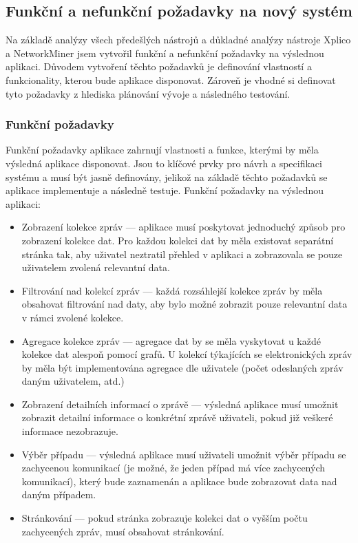 \subsection{Funkční a nefunkční požadavky na nový systém}
Na základě analýzy všech předešlých nástrojů a důkladné analýzy nástroje Xplico a NetworkMiner jsem vytvořil funkční a nefunkční požadavky na výslednou aplikaci. Důvodem vytvoření těchto požadavků je definování vlastností a funkcionality, kterou bude aplikace disponovat. Zároveň je vhodné si definovat tyto požadavky z hlediska plánování vývoje a následného testování.

\subsubsection*{Funkční požadavky}
Funkční požadavky aplikace zahrnují vlastnosti a funkce, kterými by měla výsledná aplikace disponovat. Jsou to klíčové prvky pro návrh a specifikaci systému a musí být jasně definovány, jelikož na základě těchto požadavků se aplikace implementuje a následně testuje. Funkční požadavky na výslednou aplikaci:

\begin{itemize}
    \item Zobrazení kolekce zpráv --- aplikace musí poskytovat jednoduchý způsob pro zobrazení kolekce dat. Pro každou kolekci dat by měla existovat separátní stránka tak, aby uživatel neztratil přehled v aplikaci a zobrazovala se pouze uživatelem zvolená relevantní data.
    \item Filtrování nad kolekcí zpráv --- každá rozsáhlejší kolekce zpráv by měla obsahovat filtrování nad daty, aby bylo možné zobrazit pouze relevantní data v rámci zvolené kolekce.
    \item Agregace kolekce zpráv --- agregace dat by se měla vyskytovat u každé kolekce dat alespoň pomocí grafů. U kolekcí týkajících se elektronických zpráv by měla být implementována agregace dle uživatele (počet odeslaných zpráv daným uživatelem, atd.)
    \item Zobrazení detailních informací o zprávě --- výsledná aplikace musí umožnit zobrazit detailní informace o konkrétní zprávě uživateli, pokud již veškeré informace nezobrazuje.

    \item Výběr případu --- výsledná aplikace musí uživateli umožnit výběr případu se zachycenou komunikací (je možné, že jeden případ má více zachycených komunikací), který bude zaznamenán a aplikace bude zobrazovat data nad daným případem.

    \item Stránkování --- pokud stránka zobrazuje kolekci dat o vyšším počtu zachycených zpráv, musí obsahovat stránkování.
\end{itemize}

